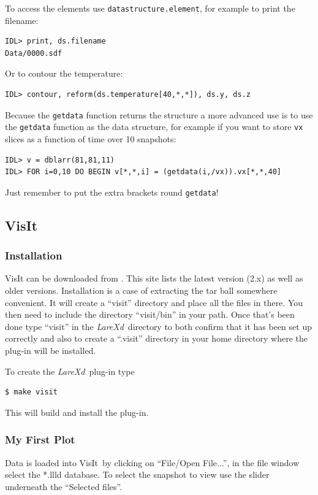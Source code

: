 \documentclass[11pt]{article}
\newcommand{\lare}{{\it LareXd}\ }
\newcommand{\visit}{VisIt\ }
\begin{document}
To access the elements use \texttt{datastructure.element}, for example to print the filename:
\begin{verbatim}
IDL> print, ds.filename
Data/0000.sdf
\end{verbatim}

Or to contour the temperature:
\begin{verbatim}
IDL> contour, reform(ds.temperature[40,*,*]), ds.y, ds.z
\end{verbatim}

Because the \texttt{getdata} function returns the structure a more advanced use is to use the \texttt{getdata} function as the data structure, for example if you want to store \texttt{vx} slices as a function of time over 10 snapshots:
\begin{verbatim}
IDL> v = dblarr(81,81,11)
IDL> FOR i=0,10 DO BEGIN v[*,*,i] = (getdata(i,/vx)).vx[*,*,40]
\end{verbatim}
Just remember to put the extra brackets round \texttt{getdata}!

\subsection{VisIt}
\subsubsection{Installation}
VisIt can be downloaded from \cite{visit}. This site lists the latest version (2.x) as well as older versions. Installation is a case of extracting the tar ball somewhere convenient. It will create a ``visit'' directory and place all the files in there. You then need to include the directory ``visit/bin'' in your path. Once that's been done type ``visit'' in the \lare directory to both confirm that it has been set up correctly and also to create a ``.visit'' directory in your home directory where the plug-in will be installed.

To create the \lare plug-in type
\begin{verbatim}
$ make visit
\end{verbatim}

This will build and install the plug-in.

\subsubsection{My First Plot}
Data is loaded into \visit by clicking on ``File/Open File...'', in the file window select the *.llld database. To select the snapshot to view use the slider underneath the ``Selected files''.
\end{document}
